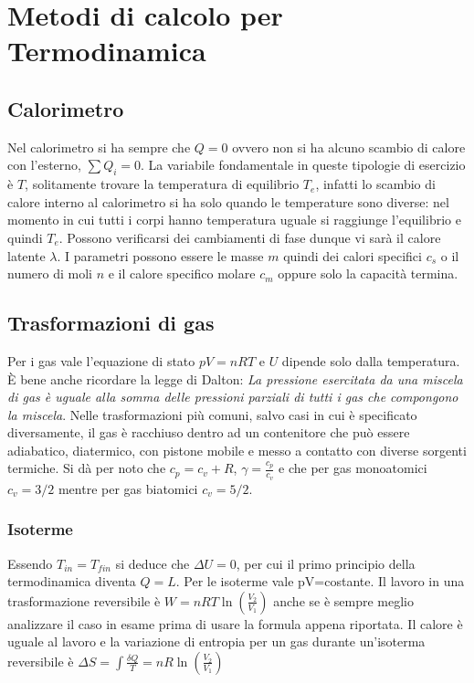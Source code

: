 \documentclass{article}
\begin{document}
\section*{Metodi di calcolo per Termodinamica}
\subsection*{Calorimetro}
Nel calorimetro si ha sempre che $Q=0$ ovvero non si ha alcuno scambio di calore con l'esterno, $\sum Q_i=0$. La variabile fondamentale in queste tipologie di esercizio è $T$, solitamente trovare la temperatura di equilibrio $T_e$, infatti lo scambio di calore interno al calorimetro si ha solo quando le temperature sono diverse: nel momento in cui tutti i corpi hanno temperatura uguale si raggiunge l'equilibrio e quindi $T_e$. Possono verificarsi dei cambiamenti di fase dunque vi sarà il calore latente $\lambda$. I parametri possono essere le masse $m$ quindi dei calori specifici $c_s$ o il numero di moli $n$ e il calore specifico molare $c_m$ oppure solo la capacità termina. 

\subsection*{Trasformazioni di gas}
Per i gas vale l'equazione di stato $pV=nRT$ e $U$ dipende solo dalla temperatura. È bene anche ricordare la legge di Dalton: \textit{La pressione esercitata da una miscela di gas è uguale alla somma delle pressioni parziali di tutti i gas che compongono la miscela}. Nelle trasformazioni più comuni, salvo casi in cui è specificato diversamente, il gas è racchiuso dentro ad un contenitore che può essere adiabatico, diatermico, con pistone mobile e messo a contatto con diverse sorgenti termiche. Si dà per noto che $c_p=c_v+R$, $\gamma=\frac{c_p}{c_v}$ e che per gas monoatomici $c_v=3/2$ mentre per gas biatomici $c_v=5/2$.
\subsubsection*{Isoterme}
Essendo $T_{in}=T_{fin}$ si deduce che $\Delta U=0$, per cui il primo principio della termodinamica diventa $Q=L$. Per le isoterme vale pV=costante. Il lavoro in una trasformazione reversibile è $W=nRT\ln(\frac{V_2}{V_1})$ anche se è sempre meglio analizzare il caso in esame prima di usare la formula appena riportata. Il calore è uguale al lavoro e la variazione di entropia per un gas durante un'isoterma reversibile è $\Delta S=\int \frac{\delta Q}{T}=nR\ln({\frac{V_2}{V_1}})$
\end{document}
